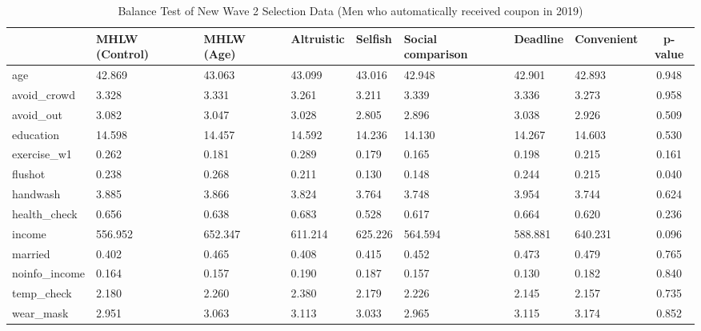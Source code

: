 \begin{table}[!h]

\caption{Balance Test of New Wave 2 Selection Data (Men who automatically received coupon in 2019) \label{tab:act2-coupon1-balance}}
\centering
\begin{tabular}[t]{l>{\centering\arraybackslash}p{3em}>{\centering\arraybackslash}p{3em}>{\centering\arraybackslash}p{3em}>{\centering\arraybackslash}p{3em}>{\centering\arraybackslash}p{3em}>{\centering\arraybackslash}p{3em}>{\centering\arraybackslash}p{3em}c}
\toprule
  & MHLW (Control) & MHLW (Age) & Altruistic & Selfish & Social comparison & Deadline & Convenient & p-value\\
\midrule
age & \num{42.869} & \num{43.063} & \num{43.099} & \num{43.016} & \num{42.948} & \num{42.901} & \num{42.893} & \num{0.948}\\
avoid\_crowd & \num{3.328} & \num{3.331} & \num{3.261} & \num{3.211} & \num{3.339} & \num{3.336} & \num{3.273} & \num{0.958}\\
avoid\_out & \num{3.082} & \num{3.047} & \num{3.028} & \num{2.805} & \num{2.896} & \num{3.038} & \num{2.926} & \num{0.509}\\
education & \num{14.598} & \num{14.457} & \num{14.592} & \num{14.236} & \num{14.130} & \num{14.267} & \num{14.603} & \num{0.530}\\
exercise\_w1 & \num{0.262} & \num{0.181} & \num{0.289} & \num{0.179} & \num{0.165} & \num{0.198} & \num{0.215} & \num{0.161}\\
flushot & \num{0.238} & \num{0.268} & \num{0.211} & \num{0.130} & \num{0.148} & \num{0.244} & \num{0.215} & \num{0.040}\\
handwash & \num{3.885} & \num{3.866} & \num{3.824} & \num{3.764} & \num{3.748} & \num{3.954} & \num{3.744} & \num{0.624}\\
health\_check & \num{0.656} & \num{0.638} & \num{0.683} & \num{0.528} & \num{0.617} & \num{0.664} & \num{0.620} & \num{0.236}\\
income & \num{556.952} & \num{652.347} & \num{611.214} & \num{625.226} & \num{564.594} & \num{588.881} & \num{640.231} & \num{0.096}\\
married & \num{0.402} & \num{0.465} & \num{0.408} & \num{0.415} & \num{0.452} & \num{0.473} & \num{0.479} & \num{0.765}\\
noinfo\_income & \num{0.164} & \num{0.157} & \num{0.190} & \num{0.187} & \num{0.157} & \num{0.130} & \num{0.182} & \num{0.840}\\
temp\_check & \num{2.180} & \num{2.260} & \num{2.380} & \num{2.179} & \num{2.226} & \num{2.145} & \num{2.157} & \num{0.735}\\
wear\_mask & \num{2.951} & \num{3.063} & \num{3.113} & \num{3.033} & \num{2.965} & \num{3.115} & \num{3.174} & \num{0.852}\\
\bottomrule
\end{tabular}
\end{table}
